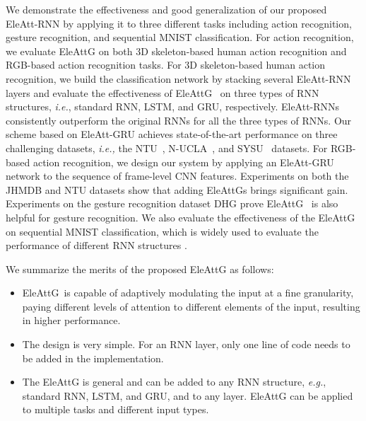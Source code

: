 \documentclass[journal]{IEEEtran}
\newcommand{\EleAttGn}{{EleAttG}}
\newcommand{\EleAttG}{{EleAttG~}}
\begin{document}
We demonstrate the effectiveness and good generalization of our proposed EleAtt-RNN by applying it to three different tasks including action recognition, gesture recognition, and sequential MNIST classification. For action recognition, we evaluate EleAttG on both 3D skeleton-based human action recognition and RGB-based action recognition tasks. For 3D skeleton-based human action recognition, we build the classification network by stacking several EleAtt-RNN layers and evaluate the effectiveness of {\EleAttG} on three types of RNN structures, {\it{i.e.}}, standard RNN, LSTM, and GRU, respectively. EleAtt-RNNs consistently outperform the original RNNs for all the three types of RNNs. Our scheme based on EleAtt-GRU achieves state-of-the-art performance on three challenging datasets, {\it i.e.,} the NTU~\cite{Shahroudy_2016_CVPR}, N-UCLA~\cite{wang2014cross}, and SYSU~\cite{hu2015jointly} datasets. For RGB-based action recognition, we design our system by applying an EleAtt-GRU network to the sequence of frame-level CNN features. Experiments on both the JHMDB \cite{jhuang2013towards} and NTU \cite{Shahroudy_2016_CVPR} datasets show that adding {\EleAttGn}s brings significant gain. Experiments on the gesture recognition dataset DHG \cite{de2016skeleton} prove {\EleAttG} is also helpful for gesture recognition. We also evaluate the effectiveness of the EleAttG on sequential MNIST classification, which is widely used to evaluate the performance of different RNN structures \cite{arjovsky2016unitary,cooijmans2016recurrent,campos2018skip,li2018independently}. 

We summarize the merits of the proposed EleAttG as follows:
\begin{itemize}
    \setlength{\itemsep}{0pt}
    \item  \EleAttG is capable of adaptively modulating the input at a fine granularity, paying different levels of attention to different elements of the input, resulting in higher performance.
    \setlength{\itemsep}{0pt}
    \item  The design is very simple. For an RNN layer, only one line of code needs to be added in the implementation. 
    \setlength{\itemsep}{0pt}
    \item The EleAttG is general and can be added to any RNN structure, {\it{e.g.}}, standard RNN, LSTM, and GRU, and to any layer. EleAttG can be applied to multiple tasks and different input types.
    \setlength{\itemsep}{0pt}
\end{itemize}
\end{document}
